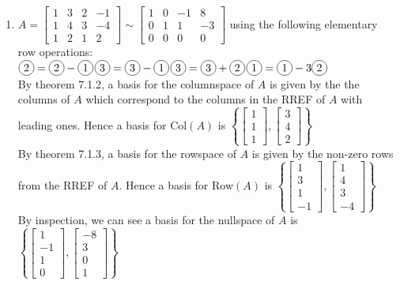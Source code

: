 \documentclass[10pt,english]{article}
\newcommand*\circled[1]{\tikz[baseline=(char.base)]{
            \node[shape=circle,draw,inner sep=2pt] (char) {#1};}}
\begin{document}
\begin{enumerate}
\begin{enumerate}
\item $A=\begin{bmatrix}1&3&2&-1\\1&4&3&-4\\1&2&1&2\end{bmatrix}\sim\begin{bmatrix}1&0&-1&8\\0&1&1&-3\\0&0&0&0\end{bmatrix}$ using the following elementary row operations: \\ $\circled{2}=\circled{2}-\circled{1}$\quad\quad\quad $\circled{3}=\circled{3}-\circled{1}$\quad\quad\quad $\circled{3}=\circled{3}+\circled{2}$\quad\quad\quad $\circled{1}=\circled{1}-3\circled{2}$ \\
By theorem 7.1.2, a basis for the columnspace of $A$ is given by the the columns of $A$ which correspond to the columns in the RREF of $A$ with leading ones. Hence a basis for Col$(A)$ is $\left\{\begin{bmatrix}1\\1\\1\end{bmatrix},\begin{bmatrix}3\\4\\2\end{bmatrix}\right\}$\\
By theorem 7.1.3, a basis for the rowspace of $A$ is given by the non-zero rows from the RREF of $A$. Hence a basis for Row$(A)$ is $\left\{\begin{bmatrix}1\\3\\1\\-1\end{bmatrix},\begin{bmatrix}1\\4\\3\\-4\end{bmatrix}\right\}$\\ 
By inspection, we can see a basis for the nullspace of $A$ is $\left\{\begin{bmatrix}1\\-1\\1\\0\end{bmatrix},\begin{bmatrix}-8\\3\\0\\1\end{bmatrix}\right\}$\\ 

\end{enumerate}
\end{enumerate}
\end{document}

